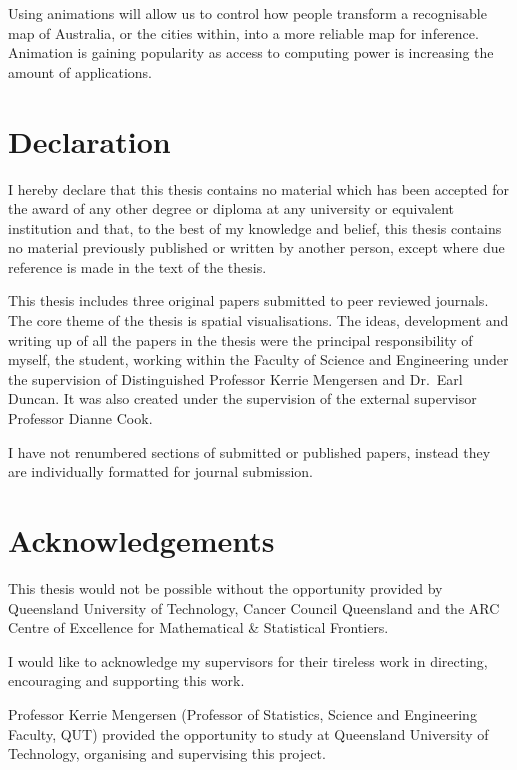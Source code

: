\documentclass{monashthesis}
\begin{document}
Using animations will allow us to control how people transform a recognisable map of Australia, or the cities within, into a more reliable map for inference. Animation is gaining popularity as access to computing power is increasing the amount of applications.

\newpage

\hypertarget{declaration}{%
\chapter*{Declaration}\label{declaration}}

I hereby declare that this thesis contains no material which has been accepted for the award of any other degree or diploma at any university or equivalent institution and that, to the best of my knowledge and belief, this thesis contains no material previously published or written by another person, except where due reference is made in the text of the thesis.

This thesis includes three original papers submitted to peer reviewed journals. The core theme of the thesis is spatial visualisations. The ideas, development and writing up of all the papers in the thesis were the principal responsibility of myself, the student, working within the Faculty of Science and Engineering under the supervision of Distinguished Professor Kerrie Mengersen and Dr.~Earl Duncan. It was also created under the supervision of the external supervisor Professor Dianne Cook.

I have not renumbered sections of submitted or published papers, instead they are individually formatted for journal submission.

\hypertarget{acknowledgements}{%
\chapter*{Acknowledgements}\label{acknowledgements}}

This thesis would not be possible without the opportunity provided by Queensland University of Technology, Cancer Council Queensland and the ARC Centre of Excellence for Mathematical \& Statistical Frontiers.

I would like to acknowledge my supervisors for their tireless work in directing, encouraging and supporting this work.

Professor Kerrie Mengersen (Professor of Statistics, Science and Engineering Faculty, QUT) provided the opportunity to study at Queensland University of Technology, organising and supervising this project.
\end{document}
